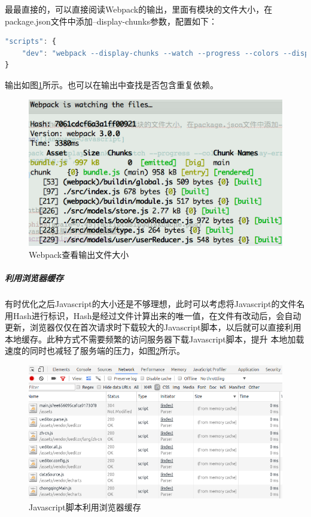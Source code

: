 \documentclass[12pt]{book}
\numberwithin{dummy}{section}
\theoremstyle{ocrenumbox}
\theoremstyle{blacknumex}
\theoremstyle{blacknumbox}
\theoremstyle{ocrenum}
\begin{document}
最最直接的，可以直接阅读Webpack的输出，里面有模块的文件大小，在package.json文件中添加--display-chunks参数，配置如下：

\begin{lstlisting}[language=Javascript]
"scripts": {
	"dev": "webpack --display-chunks --watch --progress --colors --display-error-details --config webpack/dev.config.js",
}
\end{lstlisting}


输出如图\ref{fig:webpackcheckingfilesize}所示。也可以在输出中查找是否包含重复依赖。

\begin{figure}[htbp]
	\centering
	\includegraphics[scale=0.7]{webpackcheckingfilesize.png}
	\caption{Webpack查看输出文件大小}
	\label{fig:webpackcheckingfilesize}
\end{figure}


\subparagraph{利用浏览器缓存}

有时优化之后Javascript的大小还是不够理想，此时可以考虑将Javascript的文件名用Hash进行标识，Hash是经过文件计算出来的唯一值，在文件有改动后，会自动更新，浏览器仅仅在首次请求时下载较大的Javascript脚本，以后就可以直接利用本地缓存。此种方式不需要频繁的访问服务器下载Javascript脚本，提升 本地加载速度的同时也减轻了服务端的压力，如图\ref{fig:scriptusingdiskcache}所示。

\begin{figure}[htbp]
	\centering
	\includegraphics[scale=0.45]{scriptusingdiskcache.png}
	\caption{Javascript脚本利用浏览器缓存}
	\label{fig:scriptusingdiskcache}
\end{figure}
\end{document}
